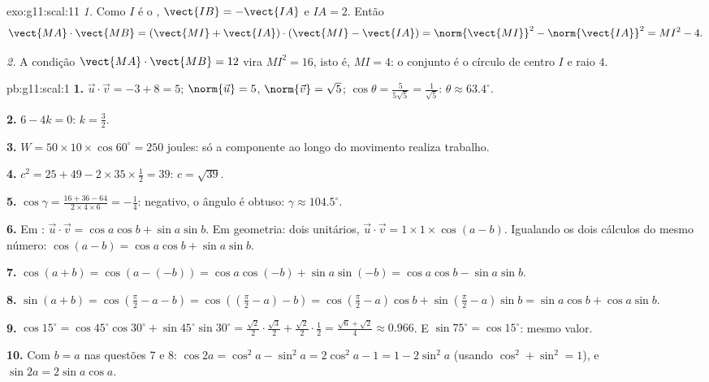 \begin{solution}{exo:g11:scal:11}
\emph{1.} Como $I$ é o , $\vect{IB} = -\vect{IA}$ e
$IA = 2$. Então
\[
\vect{MA}\cdot\vect{MB}
= (\vect{MI} + \vect{IA})\cdot(\vect{MI} - \vect{IA})
= \norm{\vect{MI}}^2 - \norm{\vect{IA}}^2
= MI^2 - 4 .
\]

\emph{2.} A condição $\vect{MA}\cdot\vect{MB} = 12$ vira $MI^2 = 16$,
isto é, $MI = 4$: o conjunto é o círculo de centro $I$ e raio $4$.
\end{solution}

\begin{solution}{pb:g11:scal:1}
\textbf{1.} $\vec u \cdot \vec v = -3 + 8 = 5$;
$\norm{\vec u} = 5$, $\norm{\vec v} = \sqrt5$;
$\cos\theta = \frac{5}{5\sqrt5} = \frac{1}{\sqrt5}$:
$\theta \approx 63.4^\circ$.

\textbf{2.} $6 - 4k = 0$: $k = \frac32$.

\textbf{3.} $W = 50 \times 10 \times \cos 60^\circ = 250$
joules: só a componente ao longo do movimento realiza
trabalho.

\textbf{4.} $c^2 = 25 + 49 - 2 \times 35 \times \frac12 = 39$:
$c = \sqrt{39}$.

\textbf{5.} $\cos\gamma = \frac{16 + 36 - 64}{2 \times 4
\times 6} = -\frac14$: negativo, o ângulo é obtuso:
$\gamma \approx 104.5^\circ$.

\textbf{6.} Em : $\vec u \cdot \vec v = \cos a \cos b
+ \sin a \sin b$. Em geometria: dois  unitários,
$\vec u \cdot \vec v = 1 \times 1 \times \cos(a - b)$.
Igualando os dois cálculos do mesmo número:
$\cos(a - b) = \cos a \cos b + \sin a \sin b$.

\textbf{7.} $\cos(a + b) = \cos(a - (-b)) = \cos a \cos(-b) +
\sin a \sin(-b) = \cos a \cos b - \sin a \sin b$.

\textbf{8.} $\sin(a + b) = \cos\left(\frac\pi2 - a - b\right)
= \cos\left(\left(\frac\pi2 - a\right) - b\right)
= \cos\left(\frac\pi2 - a\right)\cos b +
\sin\left(\frac\pi2 - a\right)\sin b
= \sin a \cos b + \cos a \sin b$.

\textbf{9.} $\cos 15^\circ = \cos 45^\circ \cos 30^\circ +
\sin 45^\circ \sin 30^\circ = \frac{\sqrt2}{2} \cdot
\frac{\sqrt3}{2} + \frac{\sqrt2}{2} \cdot \frac12 =
\frac{\sqrt6 + \sqrt2}{4} \approx 0.966$. E
$\sin 75^\circ = \cos 15^\circ$: mesmo valor.

\textbf{10.} Com $b = a$ nas questões 7 e 8:
$\cos 2a = \cos^2 a - \sin^2 a = 2\cos^2 a - 1 = 1 - 2\sin^2 a$
(usando $\cos^2 + \sin^2 = 1$), e $\sin 2a = 2 \sin a \cos a$.


\end{solution}
